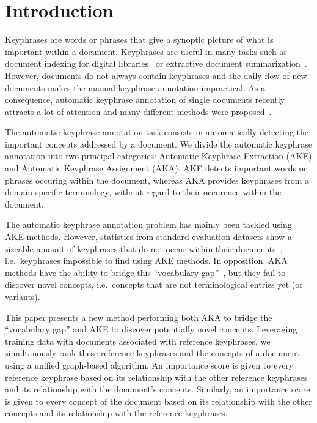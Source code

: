 \section{Introduction}
\label{sec: introduction}
  Keyphrases are words or phrases that give a synoptic picture of what is
  important within a document. Keyphrases are useful in many tasks such as
  document indexing for digital
  libraries~\cite{gutwin1999keyphrasesfordigitallibraries} or extractive
  document summarization~\cite{litvak2008graphbased}. However, documents do not
  always contain keyphrases and the daily flow of new documents makes the manual
  keyphrase annotation impractical. As a consequence, automatic keyphrase
  annotation of single documents recently attracts a lot of attention and many
  different methods were proposed~\cite{hasan2014state_of_the_art}.

  The automatic keyphrase annotation task consists in automatically detecting
  the important concepts addressed by a document. We divide the automatic
  keyphrase annotation into two principal categories: Automatic Keyphrase
  Extraction (AKE) and Automatic Keyphrase Assignment (AKA). AKE detects
  important words or phrases occuring within the document, whereas AKA provides
  keyphrases from a domain-specific terminology, without regard to their
  occurence within the document.

  The automatic keyphrase annotation problem has mainly been tackled using AKE
  methods. However, statistics from standard evaluation datasets show a sizeable
  amount of keyphrases that do not occur within their
  documents~\cite{bougouin2013topicrank}, i.e.~keyphrases impossible to find
  using AKE methods. In opposition, AKA methods have the ability to bridge this
  ``vocabulary gap''~\cite{liu2011vocabularygap}, but they fail to discover
  novel concepts, i.e.~concepts that are not terminological entries yet (or
  variants).

  This paper presents a new method performing both AKA to bridge the
  ``vocabulary gap'' and AKE to discover potentially novel concepts. Leveraging
  training data with documents associated with reference keyphrases, we
  simultanously rank these reference keyphrases and the concepts of a document
  using a unified graph-based algorithm. An importance score is given to every
  reference keyphrase based on its relationship with the other reference
  keyphrases and its relationship with the document's concepts. Similarly, an
  importance score is given to every concept of the document based on its
  relationship with the other concepts and its relationship with the reference
  keyphrases.

